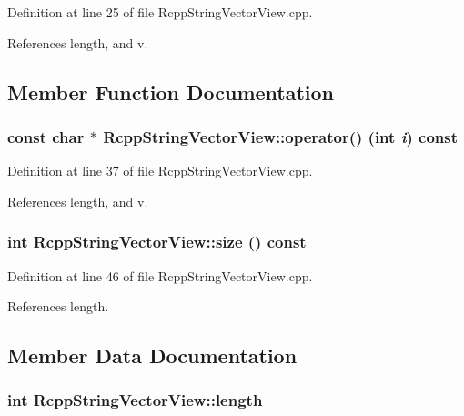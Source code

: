 Definition at line 25 of file RcppStringVectorView.cpp.

References length, and v.

\subsection{Member Function Documentation}
\hypertarget{classRcppStringVectorView_a7bbba53f770cc8e4492eea07c91a6f44}{
\subsubsection[{operator()}]{\setlength{\rightskip}{0pt plus 5cm}const char $\ast$ RcppStringVectorView::operator() (int {\em i}) const}}
\label{classRcppStringVectorView_a7bbba53f770cc8e4492eea07c91a6f44}


Definition at line 37 of file RcppStringVectorView.cpp.

References length, and v.\hypertarget{classRcppStringVectorView_ad4d268fd0fd4c21b2ddc0de5126ce21b}{
\subsubsection[{size}]{\setlength{\rightskip}{0pt plus 5cm}int RcppStringVectorView::size () const}}
\label{classRcppStringVectorView_ad4d268fd0fd4c21b2ddc0de5126ce21b}


Definition at line 46 of file RcppStringVectorView.cpp.

References length.

\subsection{Member Data Documentation}
\hypertarget{classRcppStringVectorView_aef6edaa52c234b4bb1fd1fc949fa0f25}{
\subsubsection[{length}]{\setlength{\rightskip}{0pt plus 5cm}int {\bf RcppStringVectorView::length}}}
\label{classRcppStringVectorView_aef6edaa52c234b4bb1fd1fc949fa0f25}


